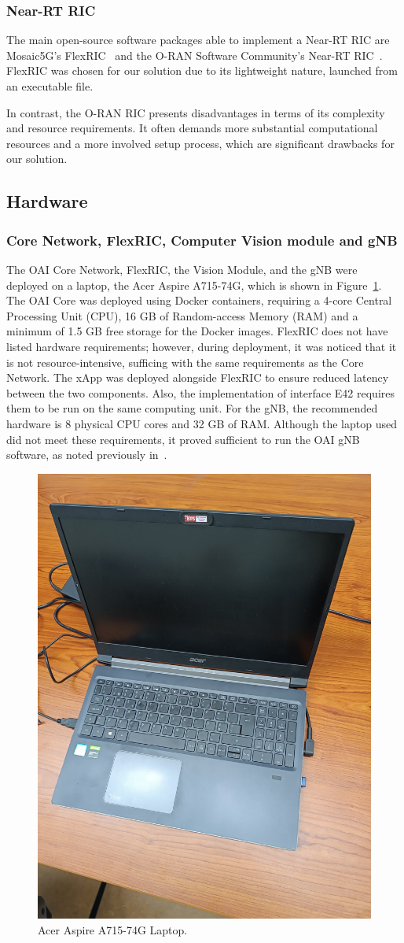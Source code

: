 \subsubsection{Near-RT RIC}
The main open-source software packages able to implement a Near-RT RIC are Mosaic5G’s FlexRIC~\cite{flexric} and the O-RAN Software Community’s Near-RT RIC~\cite{oran-sc}.
FlexRIC was chosen for our solution due to its lightweight nature, launched from an executable file.

In contrast, the O-RAN RIC presents disadvantages in terms of its complexity and resource requirements.
It often demands more substantial computational resources and a more involved setup process, which are significant drawbacks for our solution.

\subsection{Hardware}\label{subsec:hardware}


\subsubsection{Core Network, FlexRIC, Computer Vision module and gNB}
The OAI Core Network, FlexRIC, the Vision Module, and the gNB were deployed on a laptop, the Acer Aspire A715-74G, which is shown in Figure~\ref{fig:computer_acer}.
The OAI Core was deployed using Docker containers, requiring a 4-core Central Processing Unit (CPU), 16 GB of Random-access Memory (RAM) and a minimum of 1.5 GB free storage for the Docker images.
FlexRIC does not have listed hardware requirements; however, during deployment, it was noticed that it is not resource-intensive, sufficing with the same requirements as the Core Network.
The xApp was deployed alongside FlexRIC to ensure reduced latency between the two components.
Also,  the implementation of interface E42 requires them to be run on the same computing unit.
For the gNB, the recommended hardware is 8 physical CPU cores and 32 GB of RAM\@.
Although the laptop used did not meet these requirements, it proved sufficient to run the OAI gNB software, as noted previously in~\cite{queiros2023autonomous}.

\begin{figure}[H]
    \centering
    \includegraphics[width=0.3\linewidth]{figures/acer}
    \caption{Acer Aspire A715-74G Laptop.}
    \label{fig:computer_acer}
\end{figure}

